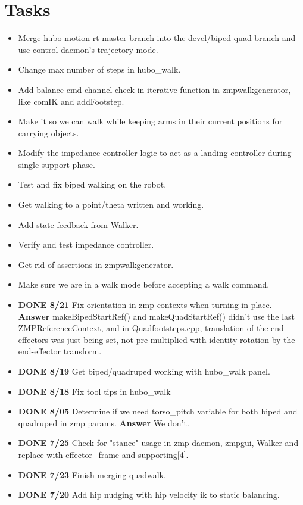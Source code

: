 \documentclass[letterpaper, 10 pt]{report}
\begin{document}
\section*{Tasks}
\begin{itemize}
\item Merge hubo-motion-rt master branch into the devel/biped-quad branch and use control-daemon's trajectory mode.
\item Change max number of steps in hubo\_walk.
\item Add balance-cmd channel check in iterative function in zmpwalkgenerator, like comIK and addFootstep.
\item Make it so we can walk while keeping arms in their current positions for carrying objects.
\item Modify the impedance controller logic to act as a landing controller during single-support phase.
\item Test and fix biped walking on the robot.
\item Get walking to a point/theta written and working.
\item Add state feedback from Walker.
\item Verify and test impedance controller.
\item Get rid of assertions in zmpwalkgenerator.
\item Make sure we are in a walk mode before accepting a walk command.
\item \textbf{DONE 8/21} Fix orientation in zmp contexts when turning in place. \newline
\textbf{Answer} makeBipedStartRef() and makeQuadStartRef() didn't use the last ZMPReferenceContext, and in Quadfootsteps.cpp, translation of the end-effectors was just being set, not pre-multiplied with identity rotation by the end-effector transform.
\item \textbf{DONE 8/19} Get biped/quadruped working with hubo\_walk panel.
\item \textbf{DONE 8/18} Fix tool tips in hubo\_walk
\item \textbf{DONE 8/05} Determine if we need torso\_pitch variable for both biped and quadruped in zmp params. \textbf{Answer} We don't.
\item \textbf{DONE 7/25} Check for "stance" usage in zmp-daemon, zmpgui, Walker and replace with effector\_frame and supporting[4].
\item \textbf{DONE 7/23} Finish merging quadwalk.
\item \textbf{DONE 7/20} Add hip nudging with hip velocity ik to static balancing.
\end{itemize}
\end{document}
